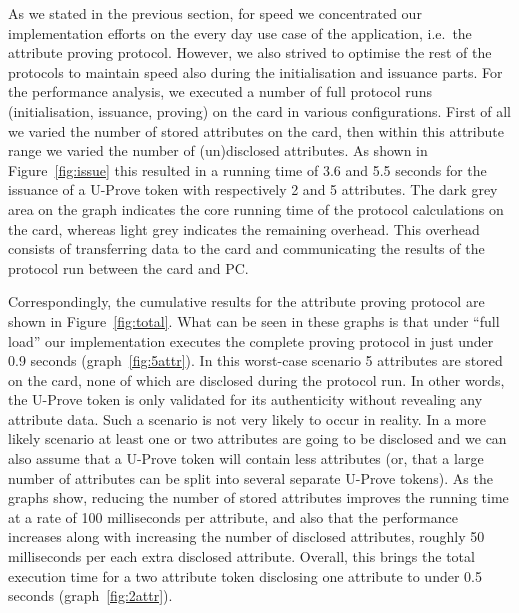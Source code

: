 As we stated in the previous section, for speed we concentrated our
implementation efforts on the every day use case of the application, i.e.\ the
attribute proving protocol. However, we also strived to optimise the rest
of the protocols to maintain speed also during the initialisation and
issuance parts. For the performance analysis, we executed a number of full
protocol runs (initialisation, issuance, proving) on the card in various
configurations. First of all we varied the number of stored
attributes on the card, then within this attribute range we varied the
number of (un)disclosed attributes. As shown in Figure~\ref{fig:issue} this
resulted in a running time of 3.6 and 5.5 seconds for the issuance of a
U-Prove token with respectively 2 and 5 attributes.
The dark grey area on the graph indicates the core running time of the
protocol calculations on the card, whereas light grey indicates the
remaining overhead. This overhead consists of transferring data to the card
and communicating the results of the protocol run between the card and PC.

Correspondingly, the cumulative results for the attribute
proving protocol are shown in Figure~\ref{fig:total}.
What can be seen in these graphs is that under ``full load'' our
implementation executes the complete proving protocol in just under
0.9 seconds (graph~\ref{fig:5attr}). In this worst-case scenario 5 attributes are
stored on the card, none of which are disclosed during the protocol
run. In other words, the U-Prove token is only validated for its
authenticity without revealing any attribute data. Such a scenario is
not very likely to occur in reality. In a more likely scenario at
least one or two attributes are going to be disclosed and we can also
assume that a U-Prove token will contain less attributes (or,
that a large number of attributes can be split into several separate
U-Prove tokens). As the graphs show, reducing the number of stored
attributes improves the running time at a rate of 100 milliseconds per
attribute, and also that the performance increases along with
increasing the number of disclosed attributes, roughly 50 milliseconds
per each extra disclosed attribute. Overall, this brings the total
execution time for a two attribute token disclosing one attribute to under
0.5 seconds (graph~\ref{fig:2attr}).

